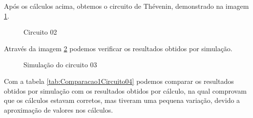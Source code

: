 Após os cálculos acima, obtemos o circuito de Thévenin, demonstrado na imagem \ref{fig:thevenin_circuito_01}.

\begin{figure}[H]
    \centering
    \caption{Circuito 02}
    \vspace{-0.3cm}
    \label{fig:thevenin_circuito_01}
\end{figure}

Através da imagem \ref{fig:SimulacaoCircuito04} podemos verificar os resultados obtidos por simulação. 

\begin{figure}[H]
    \centering
    \caption{Simulação do circuito 03}
    \vspace{-0.3cm}
    \label{fig:SimulacaoCircuito04}
\end{figure}

Com a tabela \ref{tab:Comparacao1Circuito04} podemos comparar os resultados obtidos por simulação com os resultados obtidos por cálculo, na qual comprovam que os cálculos estavam corretos, mas tiveram uma pequena variação, devido a aproximação de valores nos cálculos.

